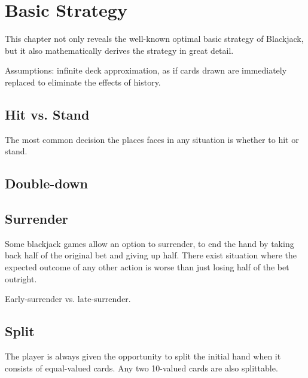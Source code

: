 
\chapter{Basic Strategy}
\label{sec:basic}

This chapter not only reveals the well-known optimal basic strategy
of Blackjack, but it also mathematically derives the strategy 
in great detail.

Assumptions: infinite deck approximation, as if cards drawn are
immediately replaced to eliminate the effects of history.

\section{Hit vs. Stand}
\label{sec:basic:hit-stand}

The most common decision the places faces in any situation
is whether to hit or stand.

\section{Double-down}
\label{sec:basic:double}

\section{Surrender}
\label{sec:basic:surrender}

Some blackjack games allow an option to surrender, 
to end the hand by taking back half of the original
bet and giving up half.
There exist situation where the expected outcome of any other action 
is worse than just losing half of the bet outright.  

Early-surrender vs. late-surrender.

\section{Split}
\label{sec:basic:split}

The player is always given the opportunity to split
the initial hand when it consists of equal-valued cards.
Any two 10-valued cards are also splittable.

